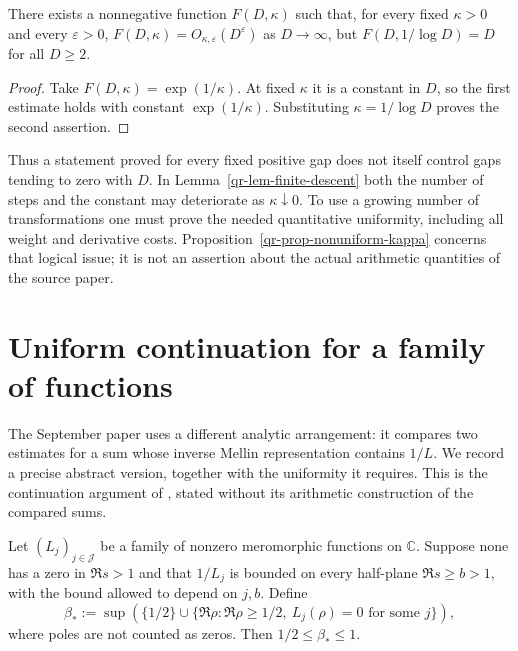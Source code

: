 \begin{proposition}
\label{qr-prop-nonuniform-kappa}
There exists a nonnegative function $F(D,\kappa)$ such that, for every
fixed $\kappa>0$ and every $\varepsilon>0$,
$F(D,\kappa)=O_{\kappa,\varepsilon}(D^\varepsilon)$ as $D\to\infty$,
but $F(D,1/\log D)=D$ for all $D\geq2$.
\end{proposition}

\begin{proof}
Take $F(D,\kappa)=\exp(1/\kappa)$. At fixed $\kappa$ it is a constant
in $D$, so the first estimate holds with constant $\exp(1/\kappa)$.
Substituting $\kappa=1/\log D$ proves the second assertion.
\end{proof}

Thus a statement proved for every fixed positive gap does not itself
control gaps tending to zero with $D$. In Lemma~\ref{qr-lem-finite-descent}
both the number of steps and the constant may deteriorate as
$\kappa\downarrow0$. To use a growing number of transformations one
must prove the needed quantitative uniformity, including all weight
and derivative costs. Proposition~\ref{qr-prop-nonuniform-kappa}
concerns that logical issue; it is not an assertion about the
actual arithmetic quantities of the source paper.

\section{Uniform continuation for a family of functions}
\label{qr-sec-uniform}

The September paper uses a different analytic arrangement: it
compares two estimates for a sum whose inverse Mellin representation
contains $1/L$. We record a precise abstract version, together with
the uniformity it requires. This is the continuation argument of
\cite[Section~2]{OpenAISeptember}, stated without its arithmetic
construction of the compared sums.

Let $(L_j)_{j\in\mathcal J}$ be a family of nonzero meromorphic
functions on $\mathbb C$. Suppose none has a zero in $\Re s>1$ and
that $1/L_j$ is bounded on every half-plane $\Re s\geq b>1$,
with the bound allowed to depend on $j,b$. Define
\[
 \beta_*:=\sup\left(\{1/2\}\cup
   \{\Re\rho:\Re\rho\geq1/2,\ L_j(\rho)=0
                        \text{ for some }j\}\right),
\]
where poles are not counted as zeros. Then $1/2\leq\beta_*\leq1$.

